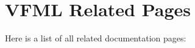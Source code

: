 \section{VFML Related Pages}
Here is a list of all related documentation pages:\begin{CompactList}
\item {}

\item {}

\item {}

\end{CompactList}
